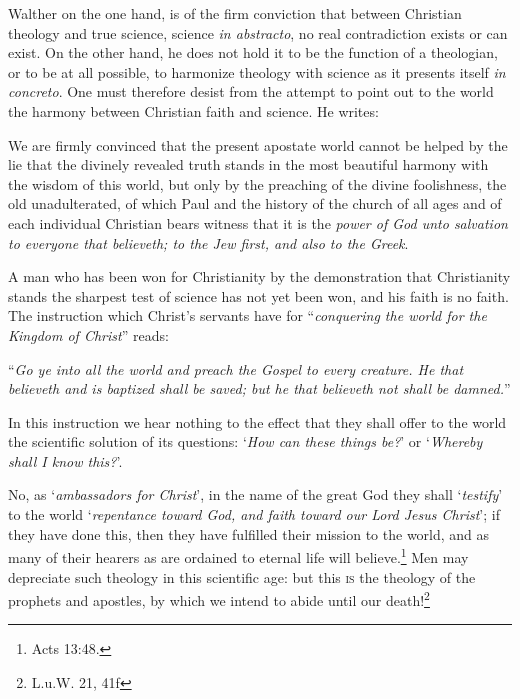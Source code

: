                 Walther on the one hand, is of the firm conviction that between Christian theology and true science, science \textit{in abstracto}, no real contradiction exists or can exist.  On the other hand, he does not hold it to be the function of a theologian, or to be at all possible, to harmonize theology with science as it presents itself \textit{in concreto}.  One must therefore desist from the attempt to point out to the world the harmony between Christian faith and science.  He writes:\begin{fancyquotes}We are firmly convinced that the present apostate world cannot be helped by the lie that the divinely revealed truth stands in the most beautiful harmony with the wisdom of this world, but only by the preaching of the divine foolishness, the old unadulterated, of which Paul and the history of the church of all ages and of each individual Christian bears witness that it is the \textit{power of God unto salvation to everyone that believeth; to the Jew first, and also to the Greek}. \par A man who has been won for Christianity by the demonstration that Christianity stands the sharpest test of science has not yet been won, and his faith is no faith.  The instruction which Christ’s servants have for “\textit{conquering the world for the Kingdom of Christ}” reads: \begin{displayquote} “\textit{Go ye into all the world and preach the Gospel to every creature.  He that believeth and is baptized shall be saved; but he that believeth not shall be damned.}'' \end{displayquote} In this instruction we hear nothing to the effect that they shall offer to the world the scientific solution of its questions: ‘\textit{How can these things be?}’ or ‘\textit{Whereby shall I know this?}’.  \par No, as ‘\textit{ambassadors for Christ}’, in the name of the great God they shall ‘\textit{testify}’ to the world ‘\textit{repentance toward God, and faith toward our Lord Jesus Christ}’; if they have done this, then they have fulfilled their mission to the world, and as many of their hearers as are ordained to eternal life will believe.\footnote{Acts 13:48.}  Men may depreciate such theology in this scientific age: but this \textsc{is} the theology of the prophets and apostles, by which we intend to abide until our death!\footnote{L.u.W. 21, 41f}
\end{fancyquotes}
